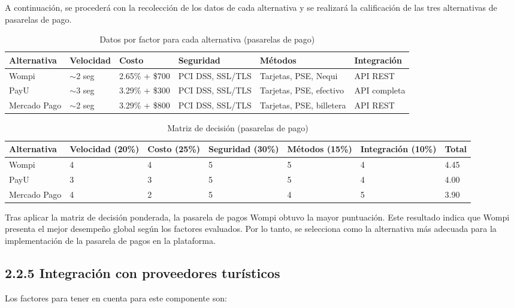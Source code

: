 \documentclass[12pt,a4paper]{article}
\newcommand{\subsectiontitle}[1]{\subsection{#1}}
\begin{document}
A continuación, se procederá con la recolección de los datos de cada alternativa y se realizará la calificación de las tres alternativas de pasarelas de pago.

\begin{table}[H]
\centering
\footnotesize
\begin{tabular}{p{2cm}p{2cm}p{2.5cm}p{2.5cm}p{2cm}p{2cm}}
\toprule
\textbf{Alternativa} & \textbf{Velocidad} & \textbf{Costo} & \textbf{Seguridad} & \textbf{Métodos} & \textbf{Integración} \\
\midrule
Wompi & $\sim$2 seg & 2.65\% + \$700 & PCI DSS, SSL/TLS & Tarjetas, PSE, Nequi & API REST \\
\addlinespace
PayU & $\sim$3 seg & 3.29\% + \$300 & PCI DSS, SSL/TLS & Tarjetas, PSE, efectivo & API completa \\
\addlinespace
Mercado Pago & $\sim$2 seg & 3.29\% + \$800 & PCI DSS, SSL/TLS & Tarjetas, PSE, billetera & API REST \\
\bottomrule
\end{tabular}
\caption{Datos por factor para cada alternativa (pasarelas de pago)}
\end{table}

\begin{table}[H]
\centering
\footnotesize
\begin{tabular}{p{2cm}p{2cm}p{2cm}p{2cm}p{2cm}p{2cm}p{2cm}}
\toprule
\textbf{Alternativa} & \textbf{Velocidad (20\%)} & \textbf{Costo (25\%)} & \textbf{Seguridad (30\%)} & \textbf{Métodos (15\%)} & \textbf{Integración (10\%)} & \textbf{Total} \\
\midrule
Wompi & 4 & 4 & 5 & 5 & 4 & 4.45 \\
PayU & 3 & 3 & 5 & 5 & 4 & 4.00 \\
Mercado Pago & 4 & 2 & 5 & 4 & 5 & 3.90 \\
\bottomrule
\end{tabular}
\caption{Matriz de decisión (pasarelas de pago)}
\end{table}

Tras aplicar la matriz de decisión ponderada, la pasarela de pagos Wompi obtuvo la mayor puntuación. Este resultado indica que Wompi presenta el mejor desempeño global según los factores evaluados. Por lo tanto, se selecciona como la alternativa más adecuada para la implementación de la pasarela de pagos en la plataforma.

\subsectiontitle{2.2.5 Integración con proveedores turísticos}

Los factores para tener en cuenta para este componente son:
\end{document}

